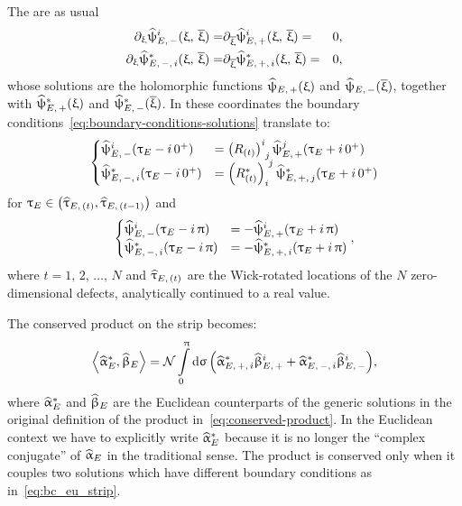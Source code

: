 The \eom are as usual
\begin{eqnarray}
  \partial_{\upxi} \widehat{\uppsi}_{E,\, -}^i( \upxi,\, \overline{\upxi} )
  = &
  \partial_{\overline{\upxi}} \widehat{\uppsi}_{E,\, +}^i( \upxi,\, \overline{\upxi} )
  = &
  0,
  \\
  \partial_{\upxi} \widehat{\uppsi}_{E,\, -,\, i}^*( \upxi,\, \overline{\upxi} )
  = &
  \partial_{\overline{\upxi}} \widehat{\uppsi}_{E,\, +,\, i}^*( \upxi,\, \overline{\upxi} )
  = &
  0,
\end{eqnarray}
whose solutions are the holomorphic functions $\widehat{\uppsi}_{E,\, +}( \upxi )$ and $\widehat{\uppsi}_{E,\, -}( \overline{\upxi} )$, together with $\widehat{\uppsi}_{E,\, +}^*( \upxi )$ and $\widehat{\uppsi}_{E,\, -}^*( \overline{\upxi} )$.
In these coordinates the boundary conditions~\eqref{eq:boundary-conditions-solutions} translate to:
\begin{equation}
  \begin{cases}
    \hpsi_{E,\, -}^i( \tau_E - i\, 0^+ )
    & =
    \tensor{\qty( R_{(t)} )}{^i_j}\,
    \hpsi_{E,\, +}^j(\tau_E + i\, 0^+ )
    \\
    \hpsi_{E,\, -,\, i}^{*}( \tau_E - i\, 0^+ )
    & =
    \tensor{\qty( R_{(t)}^* )}{_i^j}\,
    \hpsi_{E,\, +,\, j}^*(\tau_E + i\, 0^+ )
  \end{cases}
  \label{eq:bc_eu_strip}
\end{equation}
for $\uptau_E \in \qty( \widehat{\uptau}_{E,\, (t)}, \widehat{\uptau}_{E,\, (t-1)} )$ and
\begin{equation}
  \begin{cases}
    \widehat{\uppsi}_{E,\, -}^i( \uptau_E - i\, \uppi )
    & =
    -\widehat{\uppsi}_{E,\, +}^i( \uptau_E + i\, \uppi )
    \\
    \widehat{\uppsi}_{E,\, -,\, i}^*( \uptau_E - i\, \uppi )
    & =
    -\widehat{\uppsi}_{E,\, +,\, i}^*( \uptau_E + i\, \uppi )
  \end{cases},
\end{equation}
where $t = 1,\, 2,\, \dots,\, N$ and $\widehat{\uptau}_{E,\, (t)}$ are the Wick-rotated locations of the $N$ zero-dimensional defects, analytically continued to a real value.

The conserved product on the strip becomes:
\begin{equation}
  \left\langle \widehat{\upalpha}^*_E, \widehat{\upbeta}_E \right\rangle
  =
  \mathcal{N}
  \int\limits_{0}^{\uppi} \dd{\ensuremath{\upsigma}}
  \qty(
    \widehat{\upalpha}^*_{E,\, +,\, i} \widehat{\upbeta}_{E,\, +}^i
    +
    \widehat{\upalpha}^*_{E,\, -,\, i}  \widehat{\upbeta}_{E,\, -}^i
  ),
  \label{eq:euclidean-conserved-product-strip}
\end{equation}
where $\widehat{\upalpha}^*_E$ and $\widehat{\upbeta}_E$ are the Euclidean counterparts of the generic solutions in the original definition of the product in~\eqref{eq:conserved-product}.
In the Euclidean context we have to explicitly write $\widehat{\upalpha}^*_E$ because it is no longer the ``complex conjugate''  of $\widehat{\upalpha}_E$ in the traditional sense.
The product is conserved only when it couples two solutions which have different boundary conditions as in~\eqref{eq:bc_eu_strip}.

